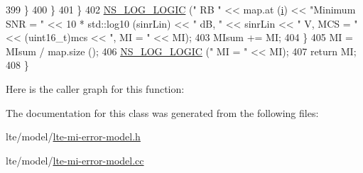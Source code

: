 \begin{DoxyCode}
399                 \}
400             \}
401         \}
402       \hyperlink{group__logging_ga88acd260151caf2db9c0fc84997f45ce}{NS\_LOG\_LOGIC} (\textcolor{stringliteral}{" RB "} << map.at (\hyperlink{bernuolliDistribution_8m_a6f6ccfcf58b31cb6412107d9d5281426}{i}) << \textcolor{stringliteral}{"Minimum SNR = "} << 10 * std::log10 (sinrLin) << \textcolor{stringliteral}{"
       dB, "} << sinrLin << \textcolor{stringliteral}{" V, MCS = "} << (uint16\_t)mcs << \textcolor{stringliteral}{", MI = "} << MI);
403       MIsum += MI;
404     \}
405   MI = MIsum / map.size ();
406   \hyperlink{group__logging_ga88acd260151caf2db9c0fc84997f45ce}{NS\_LOG\_LOGIC} (\textcolor{stringliteral}{" MI = "} << MI);
407   \textcolor{keywordflow}{return} MI;
408 \}
\end{DoxyCode}


Here is the caller graph for this function\+:




The documentation for this class was generated from the following files\+:\begin{DoxyCompactItemize}
\item 
lte/model/\hyperlink{lte-mi-error-model_8h}{lte-\/mi-\/error-\/model.\+h}\item 
lte/model/\hyperlink{lte-mi-error-model_8cc}{lte-\/mi-\/error-\/model.\+cc}\end{DoxyCompactItemize}
